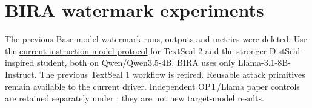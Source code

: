 \section{BIRA watermark
experiments}\label{record-docs-bira-replication-md-bira-watermark-experiments}

The previous Base-model watermark runs, outputs and metrics were
deleted. Use the \href{records/docs/instruct_watermarking.tex}{current
instruction-model protocol} for TextSeal 2 and the stronger
DistSeal-inspired student, both on Qwen/Qwen3.5-4B. BIRA uses only
Llama-3.1-8B-Instruct. The previous TextSeal 1 workflow is retired.
Reusable attack primitives remain available to the current driver.
Independent OPT/Llama paper controls are retained separately under
\texttt{};
they are not new target-model results.
